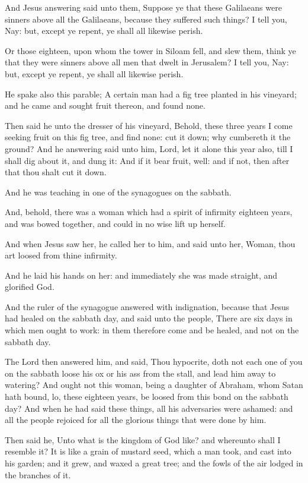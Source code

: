 \verse And Jesus answering said unto them, Suppose ye that these Galilaeans were sinners above all the Galilaeans, because they suffered such things?  \verse I tell you, Nay: but, except ye repent, ye shall all likewise perish.

\verse Or those eighteen, upon whom the tower in Siloam fell, and slew them, think ye that they were sinners above all men that dwelt in Jerusalem?  \verse I tell you, Nay: but, except ye repent, ye shall all likewise perish.

\verse He spake also this parable; A certain man had a fig tree planted in his vineyard; and he came and sought fruit thereon, and found none.

\verse Then said he unto the dresser of his vineyard, Behold, these three years I come seeking fruit on this fig tree, and find none: cut it down; why cumbereth it the ground?  \verse And he answering said unto him, Lord, let it alone this year also, till I shall dig about it, and dung it: \verse And if it bear fruit, well: and if not, then after that thou shalt cut it down.

\verse And he was teaching in one of the synagogues on the sabbath.

\verse And, behold, there was a woman which had a spirit of infirmity eighteen years, and was bowed together, and could in no wise lift up herself.

\verse And when Jesus saw her, he called her to him, and said unto her, Woman, thou art loosed from thine infirmity.

\verse And he laid his hands on her: and immediately she was made straight, and glorified God.

\verse And the ruler of the synagogue answered with indignation, because that Jesus had healed on the sabbath day, and said unto the people, There are six days in which men ought to work: in them therefore come and be healed, and not on the sabbath day.

\verse The Lord then answered him, and said, Thou hypocrite, doth not each one of you on the sabbath loose his ox or his ass from the stall, and lead him away to watering?  \verse And ought not this woman, being a daughter of Abraham, whom Satan hath bound, lo, these eighteen years, be loosed from this bond on the sabbath day?  \verse And when he had said these things, all his adversaries were ashamed: and all the people rejoiced for all the glorious things that were done by him.

\verse Then said he, Unto what is the kingdom of God like? and whereunto shall I resemble it?  \verse It is like a grain of mustard seed, which a man took, and cast into his garden; and it grew, and waxed a great tree; and the fowls of the air lodged in the branches of it.

